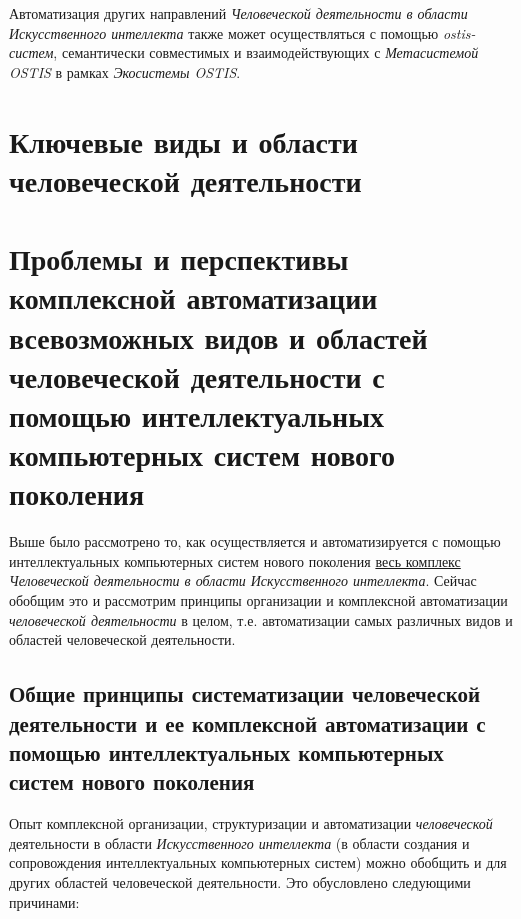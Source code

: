 Автоматизация других направлений \textit{Человеческой деятельности в области Искусственного интеллекта} также может осуществляться с помощью \textit{ostis-систем}, семантически совместимых и взаимодействующих с \textit{Метасистемой OSTIS} в рамках \textit{Экосистемы OSTIS}.

\section{Ключевые виды и области человеческой деятельности}
\label{sec_activity_types}

\section{Проблемы и перспективы комплексной автоматизации всевозможных видов и областей человеческой деятельности с помощью интеллектуальных компьютерных систем нового поколения}
\label{sec_activity_perspectives}

Выше было рассмотрено то, как осуществляется и автоматизируется с помощью интеллектуальных компьютерных систем нового поколения \underline{весь комплекс} \textit{Человеческой деятельности в области Искусственного интеллекта}. Сейчас обобщим это и рассмотрим принципы организации и комплексной автоматизации \textit{человеческой деятельности} в целом, т.е. автоматизации самых различных видов и областей человеческой деятельности.

\subsection{Общие принципы систематизации человеческой деятельности и ее комплексной автоматизации с помощью интеллектуальных компьютерных систем нового поколения}

Опыт комплексной организации, структуризации и автоматизации \textit{человеческой} деятельности в области \textit{Искусственного интеллекта} (в области создания и сопровождения интеллектуальных компьютерных систем) можно обобщить и для других областей человеческой деятельности. Это обусловлено следующими причинами:

